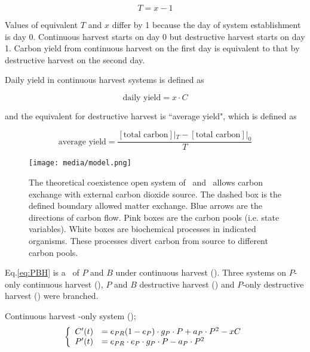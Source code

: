 \documentclass[../thesis.tex]{subfiles} %
\begin{document}
\begin{equation*}
    T = x-1
    \label{eq:TvsX}
\end{equation*}

Values of equivalent $T$ and $x$ differ by 1 because the day of system establishment is day 0.  Continuous harvest starts on day 0 but destructive harvest starts on day 1.  Carbon yield from continuous harvest on the first day is equivalent to that by destructive harvest on the second day.

Daily yield in continuous harvest systems is defined as

\begin{equation}
    \text{daily yield} = x\cdot C
    \label{eq:yield}
\end{equation}

and the equivalent for destructive harvest is ``average yield", which is defined as

\begin{equation*}
    \text{average yield} = \dfrac{[\text{total carbon}]|_{T}-[\text{total carbon}]|_{0}}{T}
    \label{eq:avgYd}
\end{equation*}

\begin{figure}[H]
    \centering
    \texttt{[image: media/model.png]}
    \caption[Model visualization]{The theoretical coexistence open system of \phy\ and \bac\ allows carbon exchange with external carbon dioxide source.  The dashed box is the defined boundary allowed matter exchange.  Blue arrows are the directions of carbon flow.  Pink boxes are the carbon pools (i.e. state variables).  White boxes are biochemical processes in indicated organisms.  These processes divert carbon from source to different carbon pools.}
    \label{f:model}
\end{figure}

Eq.\ref{eq:PBH} is a \pbs\ of $P$ and $B$ under continuous harvest (\PBH).  Three systems on $P$-only continuous harvest (\PoH), $P$ and $B$ destructive harvest (\PBN) and $P$-only destructive harvest (\PoN) were branched.

Continuous harvest \phy-only system (\PoH);
\begin{equation}\left\{\begin{array}{rl}
    C'(t) &= e_{PR}(1-e_P)\cdot g_P\cdot P +a_P\cdot P^2 -xC\\
    P'(t) &= e_{PR}\cdot e_P\cdot g_P\cdot P -a_P\cdot P^2
\end{array}\right.\label{eq:PoH}\end{equation}
\end{document}
